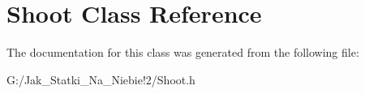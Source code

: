 \hypertarget{class_shoot}{}\section{Shoot Class Reference}
\label{class_shoot}


The documentation for this class was generated from the following file\+:\begin{DoxyCompactItemize}
\item 
G\+:/\+Jak\+\_\+\+Statki\+\_\+\+Na\+\_\+\+Niebie!2/Shoot.\+h\end{DoxyCompactItemize}
